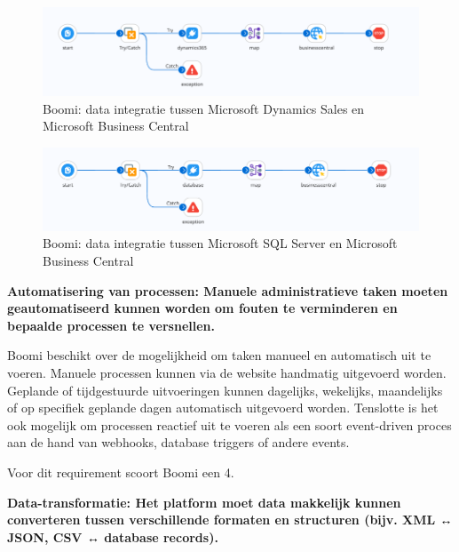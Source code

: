 \begin{figure}[H]
    \centering
    \includegraphics[width=\textwidth,height=\textheight,keepaspectratio]{../bachproef/images/Boomi_Quote_Creation.png}
    \caption{Boomi: data integratie tussen Microsoft Dynamics Sales en Microsoft Business Central}
\end{figure}

\begin{figure}[H]
    \centering
    \includegraphics[width=\textwidth,height=\textheight,keepaspectratio]{../bachproef/images/Boomi_Database_BusinessCentral.png}
    \caption{Boomi: data integratie tussen Microsoft SQL Server en Microsoft Business Central}
\end{figure}

\vspace{\baselineskip}

\textbf{Automatisering van processen: Manuele administratieve taken moeten geautomatiseerd kunnen worden om fouten te verminderen en bepaalde processen te versnellen.}

\vspace{\baselineskip}

Boomi beschikt over de mogelijkheid om taken manueel en automatisch uit te voeren. Manuele processen kunnen via de website handmatig uitgevoerd worden. Geplande of tijdgestuurde uitvoeringen kunnen dagelijks, wekelijks, maandelijks of op specifiek geplande dagen automatisch uitgevoerd worden. Tenslotte is het ook mogelijk om processen reactief uit te voeren als een soort event-driven proces aan de hand van webhooks, database triggers of andere events.

Voor dit requirement scoort Boomi een 4.


\vspace{\baselineskip}
\textbf{Data-transformatie: Het platform moet data makkelijk kunnen converteren tussen verschillende formaten en structuren (bijv. XML ↔ JSON, CSV ↔ database records).}

